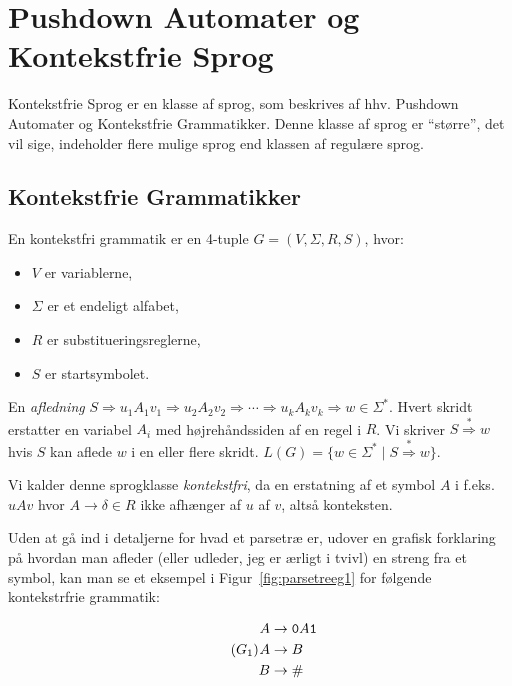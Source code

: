 \chapter{Pushdown Automater og Kontekstfrie Sprog}

Kontekstfrie Sprog er en klasse af sprog, som beskrives af hhv. Pushdown Automater og Kontekstfrie Grammatikker. Denne klasse af sprog er ``større'', det vil sige, indeholder flere mulige sprog end klassen af regulære sprog.

\section{Kontekstfrie Grammatikker}%
\label{sec:label}

\begin{definition}
  En kontekstfri grammatik er en 4-tuple $G = (V, \Sigma, R, S)$, hvor:
  \begin{itemize}
    \item $V$ er variablerne,
    \item $\Sigma$ er et endeligt alfabet,
    \item $R$ er substitueringsreglerne,
    \item $S$ er startsymbolet.
  \end{itemize}
\end{definition}

En \textit{afledning} $S \Rightarrow u_{1}A_{1}v_{1} \Rightarrow u_{2}A_{2}v_{2} \Rightarrow \cdots \Rightarrow u_{k}A_{k}v_{k} \Rightarrow w \in \Sigma^{*}$. Hvert skridt erstatter en variabel $A_{i}$ med højrehåndssiden af en regel i $R$. Vi skriver $S \stackrel{*}{\Rightarrow} w$ hvis $S$ kan aflede $w$ i en eller flere skridt. $L(G) = \{w \in \Sigma^{*} \mid S \stackrel{*}{\Rightarrow} w\}$.

Vi kalder denne sprogklasse \textit{kontekstfri}, da en erstatning af et symbol $A$ i f.eks. $uAv$ hvor $A \rightarrow \delta \in R$ ikke afhænger af $u$ af $v$, altså konteksten.

Uden at gå ind i detaljerne for hvad et parsetræ er, udover en grafisk forklaring på hvordan man afleder (eller udleder, jeg er ærligt i tvivl) en streng fra et symbol, kan man se et eksempel i Figur~\ref{fig:parsetreeg1} for følgende kontekstrfrie grammatik:

\begin{equation}
	\tag{$G_{1}$}
	\begin{split}
		A & \rightarrow \mathtt{0}A \mathtt{1} \\
		A & \rightarrow B                      \\
		B & \rightarrow \mathtt{\#}
	\end{split}
	\label{eqn:G1}
\end{equation}

